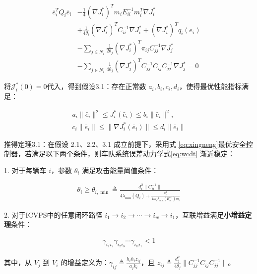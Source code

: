 \documentclass[10.5pt,a4paper,twoside,twocolumn]{ctexart}
\begin{document}
\begin{equation}
\begin{aligned}
	\bar{e}_i^T Q_i \bar{e}_i &- \frac{1}{4} (\nabla J_i^*)^T m_i E_{ii}^{-1} m_i^T \nabla J_i^* \\
	&+ \frac{1}{4\theta_i} (\nabla J_i^*)^T C_{ii}^{-1} \nabla J_i^* + (\nabla J_i^*)^T q_i(e_i) \\
	&- \sum_{j \in N_i} \frac{1}{2\theta_j} (\nabla J_i^*)^T \pi_{ij} C_{jj}^{-1} \nabla J_j^* \\
	&- \sum_{j \in N_i} \frac{1}{4\theta_j} (\nabla J_j^*)^T C_{jj}^{-1} C_{ij} C_{jj}^{-1} \nabla J_j^* = 0 \quad 
\end{aligned}
\end{equation}

将$\mathcal{J}_i^*(0)=0$代入，得到假设3.1：存在正常数 $a_i, b_i, c_i, d_i$，使得最优性能指标满足：

\begin{equation}
	\begin{aligned}
 a_i \|\bar{e}_i\|^2 \le J_i^*(\bar{e}_i) \le b_i \|\bar{e}_i\|^2, \\ 
 c_i \|\bar{e}_i\| \le \|\nabla J_i^*(\bar{e}_i)\| \le d_i \|\bar{e}_i\|
	\end{aligned}
	\label{eq:xingneng}
\end{equation}

推得定理3.1：在假设 2.1、2.2、3.1 成立前提下，采用式 \eqref{eq:xingneng}最优安全控制器，若满足以下两个条件，则车队系统误差动力学式\eqref{eq:wcdt} 渐近稳定：

1.  对于每辆车 $i$，参数 $\theta_i$ 满足攻击能量阈值条件：

\begin{equation}
	\begin{aligned}
		\theta_i \ge \theta_{i,\min} \triangleq \frac{d_i^2 \|C_{ii}^{-1}\|}{4\lambda_{\min}(Q_i) + \frac{c_i^2}{4 m_i \lambda_{\min}(E_{ii}^{-1}) m_i}} 
	\end{aligned}
\end{equation}

2.  对于ICVPS中的任意闭环路径 $i_1 \to i_2 \to \cdots \to i_w \to i_1$，互联增益满足\textbf{小增益定理}条件：

\begin{equation}
	\begin{aligned}
	\gamma_{i_1 i_2} \gamma_{i_2 i_3} \cdots \gamma_{i_w i_1} < 1
	\end{aligned}
\end{equation}

其中，从 $V_j$ 到 $V_i$ 的增益定义为：$\gamma_{ij} \triangleq \frac{h_i \bar{n}_i z_{ij}}{a_j k_i}$，且 $z_{ij} \triangleq \frac{d_j^2}{4\theta_j} \|C_{jj}^{-1} C_{ij} C_{jj}^{-1}\|$。
\end{document}
